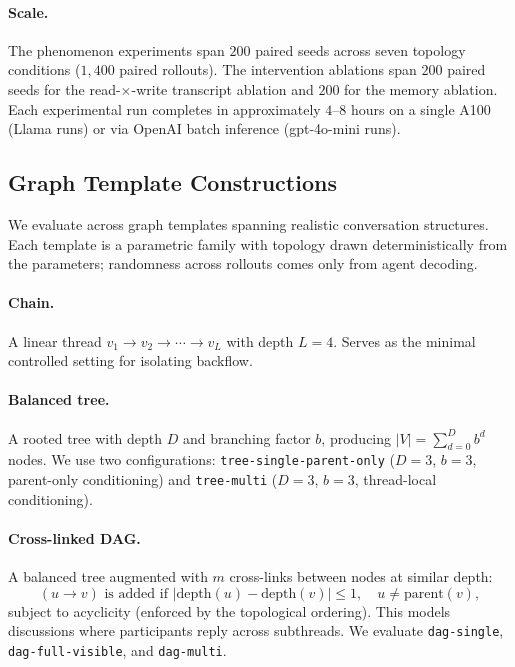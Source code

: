 \paragraph{Scale.}
The phenomenon experiments span $200$ paired seeds across seven topology conditions ($1{,}400$ paired rollouts).
The intervention ablations span $200$ paired seeds for the read-$\times$-write transcript ablation and $200$ for the memory ablation.
Each experimental run completes in approximately $4$--$8$ hours on a single A100 (Llama runs) or via OpenAI batch inference (gpt-4o-mini runs).

\subsection{Graph Template Constructions}
\label{app:templates}

We evaluate across graph templates spanning realistic conversation structures.
Each template is a parametric family with topology drawn deterministically from the parameters; randomness across rollouts comes only from agent decoding.

\paragraph{Chain.}
A linear thread $v_1 \to v_2 \to \cdots \to v_L$ with depth $L = 4$.
Serves as the minimal controlled setting for isolating backflow.

\paragraph{Balanced tree.}
A rooted tree with depth $D$ and branching factor $b$, producing $|V| = \sum_{d=0}^{D} b^d$ nodes.
We use two configurations: \texttt{tree-single-parent-only} ($D{=}3$, $b{=}3$, parent-only conditioning) and \texttt{tree-multi} ($D{=}3$, $b{=}3$, thread-local conditioning).

\paragraph{Cross-linked DAG.}
A balanced tree augmented with $m$ cross-links between nodes at similar depth:
\[
(u \to v) \text{ is added if } |\mathrm{depth}(u) - \mathrm{depth}(v)| \leq 1, \quad u \neq \mathrm{parent}(v),
\]
subject to acyclicity (enforced by the topological ordering).
This models discussions where participants reply across subthreads.
We evaluate \texttt{dag-single}, \texttt{dag-full-visible}, and \texttt{dag-multi}.

